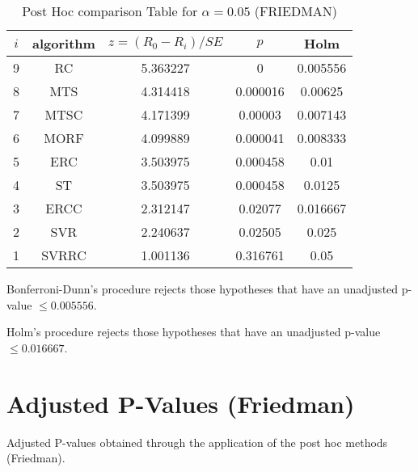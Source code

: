 \documentclass[a4paper,10pt]{article}
\begin{document}
\begin{landscape}
\begin{table}[!htp]
\centering\footnotesize
\begin{tabular}{ccccc}
$i$&algorithm&$z=(R_0 - R_i)/SE$&$p$&Holm \\
\hline9&RC&5.363227&0&0.005556\\8&MTS&4.314418&0.000016&0.00625\\7&MTSC&4.171399&0.00003&0.007143\\6&MORF&4.099889&0.000041&0.008333\\5&ERC&3.503975&0.000458&0.01\\4&ST&3.503975&0.000458&0.0125\\3&ERCC&2.312147&0.02077&0.016667\\2&SVR&2.240637&0.02505&0.025\\1&SVRRC&1.001136&0.316761&0.05\\\hline
\end{tabular}
\caption{Post Hoc comparison Table for $\alpha=0.05$ (FRIEDMAN)}
\end{table}Bonferroni-Dunn's procedure rejects those hypotheses that have an unadjusted p-value $\le0.005556$.

Holm's procedure rejects those hypotheses that have an unadjusted p-value $\le0.016667$.


\newpage

\section{Adjusted P-Values (Friedman)}


Adjusted P-values obtained through the application of the post hoc methods (Friedman).


\end{landscape}
\end{document}
